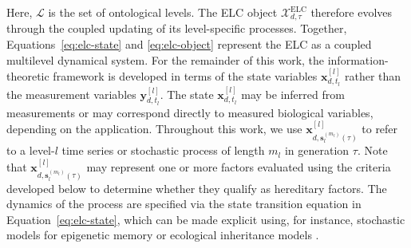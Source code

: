 \documentclass[pdflatex,sn-mathphys-num]{sn-jnl}
\theoremstyle{thmstylethree}
\theoremstyle{thmstyleone}
\begin{document}
Here, $\mathcal{L}$ is the set of ontological levels. The ELC object $\mathcal{X}_{d,\tau}^{\text{ELC}}$ therefore evolves through the coupled updating of its level-specific processes. %
Together, Equations~\eqref{eq:elc-state} and \eqref{eq:elc-object} represent the ELC as a coupled multilevel dynamical system. 
For the remainder of this work, the information-theoretic framework is developed in terms of the state variables $\mathbf{x}_{d,t_l}^{[l]}$ rather than the measurement variables $\mathbf{y}_{d,t_l}^{[l]}$. The state $\mathbf{x}_{d,t_l}^{[l]}$ may be inferred from measurements or may correspond directly to measured biological variables, depending on the application. Throughout this work, we use $\mathbf{x}_{d,\mathbf{s}_{l}^{(m_l)}(\tau)}^{[l]}$ to refer to a level-$l$ time series or stochastic process of length $m_l$ in generation $\tau$. Note that $\mathbf{x}_{d,\mathbf{s}_{l}^{(m_l)}(\tau)}^{[l]}$ may represent one or more factors evaluated using the criteria developed below to determine whether they qualify as hereditary factors. The dynamics of the process are specified via the state transition equation in Equation~\ref{eq:elc-state}, which can be made explicit using, for instance, stochastic models for epigenetic memory \cite{bruno2026stochastic} or ecological inheritance models \cite{prigent2026ecological}.
\end{document}
